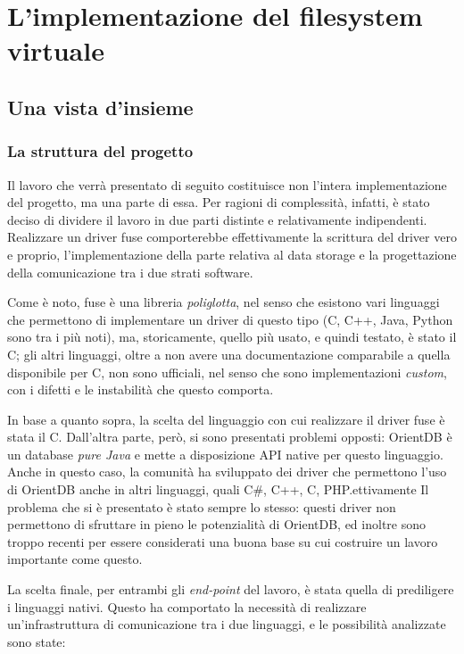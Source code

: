 \chapter{L'implementazione del filesystem virtuale}

\section{Una vista d'insieme}
\subsection{La struttura del progetto}
Il lavoro che verrà presentato di seguito costituisce non l'intera implementazione del progetto, ma una parte di essa. Per ragioni di complessità, infatti, è stato deciso di dividere il lavoro in due parti distinte e relativamente indipendenti.
Realizzare un driver fuse comporterebbe effettivamente la scrittura del driver vero e proprio, l'implementazione della parte relativa al data storage e la progettazione della comunicazione tra i due strati software.

Come è noto, fuse è una libreria \emph{poliglotta}, nel senso che esistono vari linguaggi che permettono di implementare un driver di questo tipo (C, C++, Java, Python sono tra i più noti), ma, storicamente, quello più usato, e quindi testato, è stato il C; gli altri linguaggi, oltre a non avere una documentazione comparabile a quella disponibile per C, non sono ufficiali, nel senso che sono implementazioni \emph{custom}, con i difetti e le instabilità che questo comporta.

In base a quanto sopra, la scelta del linguaggio con cui realizzare il driver fuse è stata il C. Dall'altra parte, però, si sono presentati problemi opposti: OrientDB è un database \emph{pure Java} e mette a disposizione API native per questo linguaggio. Anche in questo caso, la comunità ha sviluppato dei driver che permettono l'uso di OrientDB anche in altri linguaggi, quali C\#, C++, C, PHP.ettivamente
Il problema che si è presentato è stato sempre lo stesso: questi driver non permettono di sfruttare in pieno le potenzialità di OrientDB, ed inoltre sono troppo recenti per essere considerati una buona base su cui costruire un lavoro importante come questo.

La scelta finale, per entrambi gli \emph{end-point} del lavoro, è stata quella di prediligere i linguaggi nativi. Questo ha comportato la necessità di realizzare un'infrastruttura di comunicazione tra i due linguaggi, e le possibilità analizzate sono state:

